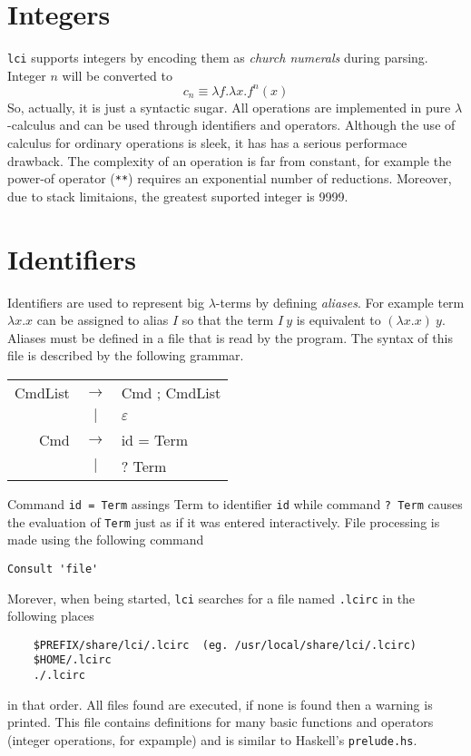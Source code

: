 \documentclass[a4paper,11pt]{article}
\newcommand{\la}{$\lambda$}
\newcommand{\lci}{\texttt{lci}}
\newcommand{\lc}{$\lambda$-calculus}
\newcommand{\kwd}[1]{\texttt{#1}}
\newcommand{\en}[1]{#1}
\begin{document}
\section{Integers}
\lci{} supports integers by encoding them as \emph{church numerals} during
parsing. Integer $n$ will be converted to
\[ c_n \equiv \lambda f.\lambda x.f^n(x) \]
So, actually, it is just a syntactic sugar. All operations are implemented in
pure \lc{} and can be used through identifiers and operators. Although the
use of calculus for ordinary operations is sleek, it has has a serious performace
drawback. The complexity of an operation is far from constant, for example
the power-of operator (\verb+**+) requires an exponential number of reductions.
Moreover, due to stack limitaions, the greatest suported integer is 9999.

\section{Identifiers}
Identifiers are used to represent big \la-terms by defining \emph{aliases}.
For example term $\lambda x.x$ can be assigned to alias $I$ so that the term
$I\ y$ is equivalent to $(\lambda x.x)\ y$. Aliases must be defined in a file
that is read by the program. The syntax of this file is described by the following
grammar.
\begin{center}
	\en{
	\begin{tabular}{rcl}
		CmdList & $\rightarrow$ & Cmd ; CmdList \\
		& $|$ & $\varepsilon$ \\
		Cmd & $\rightarrow$ & id = Term \\
		& $|$ & ? Term
	\end{tabular}
	}
\end{center}
Command \kwd{id = Term} assings Term to identifier \kwd{id} while command
\kwd{? Term} causes the evaluation of \kwd{Term} just as if it was entered interactively.
File processing is made using the following command
\begin{center}
	\verb+Consult 'file'+
\end{center}
Morever, when being started, \lci{} searches for a file named \kwd{.lcirc} in the
following places
\begin{verbatim}
	$PREFIX/share/lci/.lcirc  (eg. /usr/local/share/lci/.lcirc)
	$HOME/.lcirc
	./.lcirc
\end{verbatim}
in that order. All files found are executed, if none is found then a warning
is printed. This file contains definitions for many basic
functions and operators (integer operations, for expample) and is similar
to Haskell's \kwd{prelude.hs}.
\end{document}

